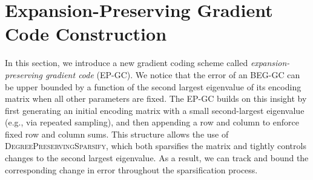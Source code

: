 \documentclass[lettersize,journal]{IEEEtran}
\newcommand{\err}[1]{\mathrm{err}(#1, S)}
\newcommand{\F}{\mathcal{F}}
\newcommand{\GB}{\boldsymbol{E}^{\mathrm{B}}}
\newcommand{\prob}[1]{\mathbb{P}\left[#1\right]}
\newcommand{\psione}[1]{\|#1\|_{\psi_1} }
\newtheorem{lemma}{Lemma}
\newcommand{\lele}{\textcolor{cyan}}
\begin{document}




\section{Expansion-Preserving Gradient Code Construction}
In this section, we introduce a new gradient coding scheme called \textit{expansion-preserving gradient code} (EP-GC). 
We notice that the error of an BEG-GC can be upper bounded by a function of the second largest eigenvalue of its encoding matrix when all other parameters are fixed. The EP-GC builds on this insight by first generating an initial encoding matrix with a small second-largest eigenvalue (e.g., via repeated sampling), and then appending a row and column to enforce fixed row and column sums. This structure allows the use of \textsc{DegreePreservingSparsify}, which both sparsifies the matrix and tightly controls changes to the second largest eigenvalue. As a result, we can track and bound the corresponding change in error throughout the sparsification process.
\end{document}
